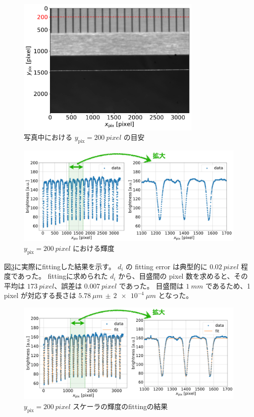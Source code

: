 \documentclass[../../main.tex]{subfiles}
\begin{document}
\begin{figure}[H]
    \centering
    \includegraphics[width=0.8\textwidth]{wiresag/wiresag_scaler_target.pdf}
    \caption{写真中における $y_{\mathrm{pix}}=\SI{200}{pixel}$ の目安}
    \label{fig:wiresag_scaler_target}
\end{figure}
\begin{figure}[H]
    \centering
    \includegraphics[width=1.0\textwidth]{wiresag/wiresag_scaler_brightness.pdf}
    \caption{$y_{\mathrm{pix}}=\SI{200}{pixel}$ における輝度}
    \label{fig:wiresag_scaler_brightness}
\end{figure}

図\ref{fig:wiresag_scaler_fitting}に実際にfittingした結果を示す。
$d_i$ の fitting error は典型的に $\SI{0.02}{pixel}$ 程度であった。
fittingに求められた $d_i$ から、目盛間の pixel 数を求めると、その平均は $\SI{173}{pixel}$、誤差は $\SI{0.007}{pixel}$ であった。
目盛間は $\SI{1}{mm}$ であるため、1 pixel が対応する長さは $\SI{5.78}{\mu m}\,\pm\,\SI{2e-4}{\mu m}$ となった。
\begin{figure}[H]
    \centering
    \includegraphics[width=1.0\textwidth]{wiresag/wiresag_scaler_fitting.pdf}
    \caption{$y_{\mathrm{pix}}=\SI{200}{pixel}$ スケーラの輝度のfittingの結果}
    \label{fig:wiresag_scaler_fitting}
\end{figure}
\end{document}
